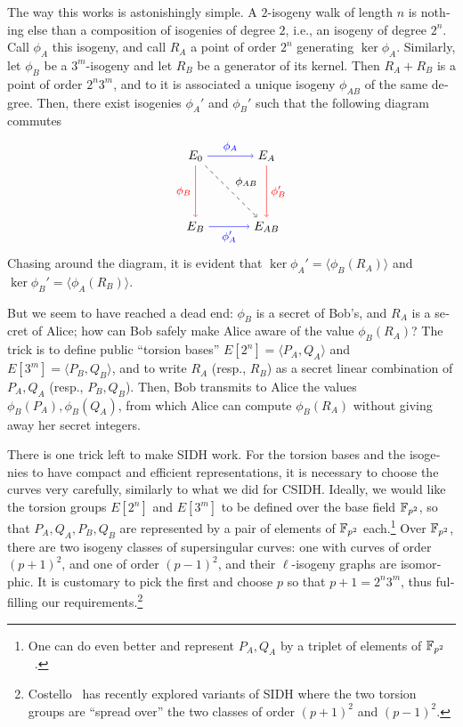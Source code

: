 \begin{otherlanguage}{english}
The way this works is astonishingly simple. A $2$-isogeny walk of
length $n$ is nothing else than a composition of isogenies of degree
$2$, i.e., an isogeny of degree $2^n$. Call $\phi_A$ this isogeny, and
call $R_A$ a point of order $2^n$ generating $\ker\phi_A$. Similarly,
let $\phi_B$ be a $3^m$-isogeny and let $R_B$ be a generator of its
kernel. Then $R_A+R_B$ is a point of order $2^n3^m$, and to it is
associated a unique isogeny $\phi_{AB}$ of the same degree. Then,
there exist isogenies $\phi_A'$ and $\phi_B'$ such that the following
diagram commutes
\begin{equation}
  \label{eq:sidh}
  \begin{tikzpicture}[scale=2,baseline=-1cm]
    \node (E0)  at (0,0) {\(E_0\)};
    \node (EA)  at (1,0) {\(E_A\)};
    \node (EB)  at (0,-1) {\(E_B\)};
    \node (EAB) at (1,-1) {\(E_{AB}\)};
    \draw[->,font=\small]
    (E0) edge[blue] node[auto] {\(\phi_A\)} (EA)
         edge[red] node[auto,swap] {\(\phi_B\)}  (EB)
         edge[dashed] node[auto] {\(\phi_{AB}\)}  (EAB)
    (EA) edge[red] node[auto] {\(\phi_B'\)}  (EAB)
    (EB) edge[blue] node[auto,swap] {\(\phi_A'\)}  (EAB);
  \end{tikzpicture}
\end{equation}
Chasing around the diagram, it is evident that
$\ker\phi_A' = \langle\phi_B(R_A)\rangle$ and
$\ker\phi_B' = \langle\phi_A(R_B)\rangle$.

But we seem to have reached a dead end: $\phi_B$ is a secret of Bob's,
and $R_A$ is a secret of Alice; how can Bob safely make Alice aware of
the value $\phi_B(R_A)$? The trick is to define public ``torsion bases''
$E[2^n]=\langle P_A,Q_A\rangle$ and $E[3^m]=\langle P_B,Q_B\rangle$,
and to write $R_A$ (resp., $R_B$) as a secret linear combination of
$P_A,Q_A$ (resp., $P_B,Q_B$). Then, Bob transmits to Alice the values
$\phi_B(P_A),\phi_B(Q_A)$, from which Alice can compute $\phi_B(R_A)$ without
giving away her secret integers.

There is one trick left to make SIDH work. For the torsion bases and
the isogenies to have compact and efficient representations, it is
necessary to choose the curves very carefully, similarly to what we
did for CSIDH.  Ideally, we would like the torsion groups $E[2^n]$ and
$E[3^m]$ to be defined over the base field $\mathbb{F}_{p^2}$, so that
$P_A,Q_A,P_B,Q_B$ are represented by a pair of elements of $\mathbb{F}_{p^2}$
each.\footnote{One can do even better and represent $P_A,Q_A$ by a
  triplet of elements of $\mathbb{F}_{p^2}$~\cite{C:CosLonNae16}.} Over
$\mathbb{F}_{p^2}$, there are two isogeny classes of supersingular curves: one
with curves of order $(p+1)^2$, and one of order $(p-1)^2$, and their
$\ell$-isogeny graphs are isomorphic. It is customary to pick the
first and choose $p$ so that $p+1=2^n3^m$, thus fulfilling our
requirements.\footnote{Costello~\cite{AC:Costello20} has
  recently explored variants of SIDH where the two torsion groups are
  ``spread over'' the two classes of order $(p+1)^2$ and $(p-1)^2$.}


\end{otherlanguage}
